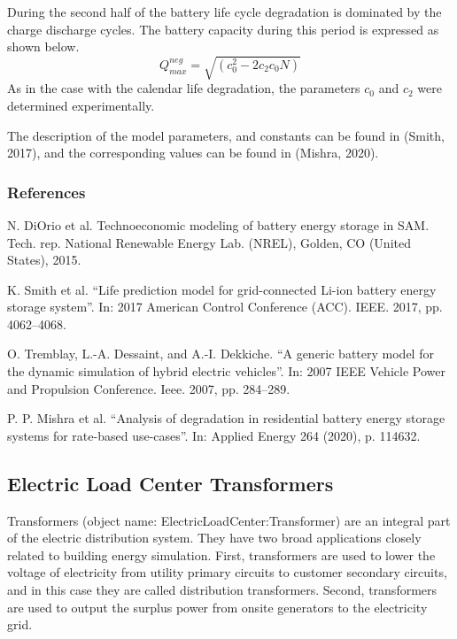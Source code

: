 During the second half of the battery life cycle degradation is dominated by the charge discharge cycles. The battery capacity during this period is expressed as shown below.
\begin{equation}
Q_{max}^{neg}=\sqrt{(c_0^2-2c_2 c_0 N)}
\label{Equation: qmax_computation_a}
\end{equation}
As in the case with the calendar life degradation, the parameters $c_0$ and $c_2$ were determined experimentally.

The description of the model parameters, and constants can be found in (Smith, 2017), and the corresponding values can be found in (Mishra, 2020).

\subsubsection{References}\label{references-022-b}

N. DiOrio et al. Technoeconomic modeling of battery energy storage in SAM. Tech. rep. National Renewable Energy Lab. (NREL), Golden, CO (United States), 2015.

\noindent
K.  Smith  et  al.  “Life  prediction  model  for  grid-connected  Li-ion  battery energy  storage  system”.  In: 2017 American Control Conference (ACC). IEEE. 2017, pp. 4062–4068.

\noindent
O. Tremblay, L.-A. Dessaint, and A.-I. Dekkiche. “A generic battery model for the dynamic simulation of hybrid electric vehicles”. In: 2007 IEEE Vehicle Power and Propulsion Conference. Ieee. 2007, pp. 284–289.

\noindent
P. P. Mishra et al. “Analysis of degradation in residential battery energy storage systems for rate-based use-cases”. In: Applied Energy 264 (2020), p. 114632.

\subsection{Electric Load Center Transformers}\label{electric-load-center-transformers}

Transformers (object name: ElectricLoadCenter:Transformer) are an integral part of the electric distribution system. They have two broad applications closely related to building energy simulation. First, transformers are used to lower the voltage of electricity from utility primary circuits to customer secondary circuits, and in this case they are called distribution transformers. Second, transformers are used to output the surplus power from onsite generators to the electricity grid.

